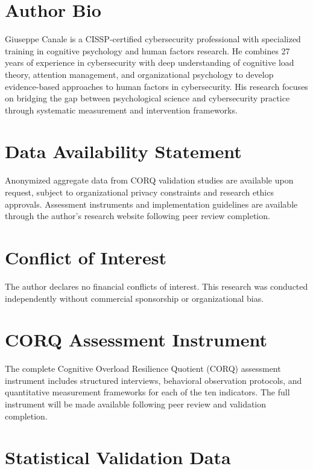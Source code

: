 \documentclass[11pt,a4paper]{article}
\begin{document}
\section*{Author Bio}

Giuseppe Canale is a CISSP-certified cybersecurity professional with specialized training in cognitive psychology and human factors research. He combines 27 years of experience in cybersecurity with deep understanding of cognitive load theory, attention management, and organizational psychology to develop evidence-based approaches to human factors in cybersecurity. His research focuses on bridging the gap between psychological science and cybersecurity practice through systematic measurement and intervention frameworks.

\section*{Data Availability Statement}

Anonymized aggregate data from CORQ validation studies are available upon request, subject to organizational privacy constraints and research ethics approvals. Assessment instruments and implementation guidelines are available through the author's research website following peer review completion.

\section*{Conflict of Interest}

The author declares no financial conflicts of interest. This research was conducted independently without commercial sponsorship or organizational bias.

\appendix

\section{CORQ Assessment Instrument}
\label{app:corq_instrument}

The complete Cognitive Overload Resilience Quotient (CORQ) assessment instrument includes structured interviews, behavioral observation protocols, and quantitative measurement frameworks for each of the ten indicators. The full instrument will be made available following peer review and validation completion.

\section{Statistical Validation Data}
\label{app:statistical_validation}
\end{document}
